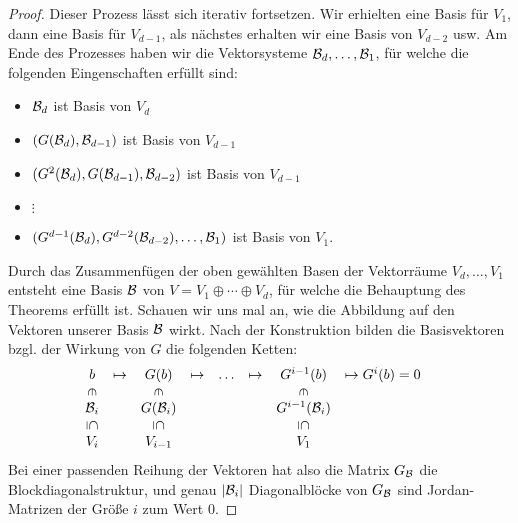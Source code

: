 \begin{proof}
	Dieser Prozess lässt sich iterativ fortsetzen. Wir erhielten eine Basis für $V_1$, dann eine Basis für $V_{d-1}$, als nächstes erhalten wir eine Basis von $V_{d-2}$ usw. Am Ende des Prozesses haben wir die Vektorsysteme $\mathcal{B}_d,\ldots,\mathcal{B}_1$, für welche die folgenden Eingenschaften erfüllt sind: 
	\begin{itemize}
	\item[] $\mathcal{B}_d$ ist Basis von $V_d$
	\item[] $(G(\mathcal{B}_d),\mathcal{B}_{d-1})$ ist Basis von $V_{d-1}$
	\item[] $(G^2(\mathcal{B}_d),G(\mathcal{B}_{d-1}), \mathcal{B}_{d-2})$ ist Basis von $V_{d-1}$
	\item[] $\vdots$
	\item[] $(G^{d-1}(\mathcal{B}_d), G^{d-2}(\mathcal{B}_{d-2}),\ldots, \mathcal{B}_1)$ ist Basis von $V_1$. 
\end{itemize} 	
Durch das Zusammenfügen der oben gewählten Basen der Vektorräume $V_d,\ldots,V_1$ entsteht eine Basis $\mathcal{B}$ von $V = V_1 \oplus \cdots \oplus V_d$, für welche die Behauptung des Theorems erfüllt ist. 
	Schauen wir uns mal an, wie die Abbildung auf den Vektoren unserer Basis $\mathcal{B}$ wirkt. Nach der Konstruktion bilden die Basisvektoren bzgl. der Wirkung von $G$ die folgenden Ketten: 
	\begin{equation*}
\begin{array}{ccccccccc}
b & \mapsto & G(b) & \mapsto & \ldots & \mapsto & G^{i-1}(b) & \mapsto G^i(b) = 0 \\
\vertical{\in} && \vertical{\in} &&&& \vertical{\in} && \\
\B_i && G(\B_i) &&&& G^{i-1}(\B_i) && \\
\vertical{\subseteq} && \vertical{\subseteq} &&&& \vertical{\subseteq} && \\
V_i && V_{i-1} &&&& V_1 &&
\end{array}
\end{equation*}
Bei einer passenden Reihung der Vektoren hat also die Matrix $G_{\mathcal{B}}$ die Blockdiagonalstruktur, und genau $|\mathcal{B}_i|$ Diagonalblöcke von $G_{\mathcal{B}}$ sind Jordan-Matrizen der Größe $i$ zum Wert $0$. 


\end{proof}
